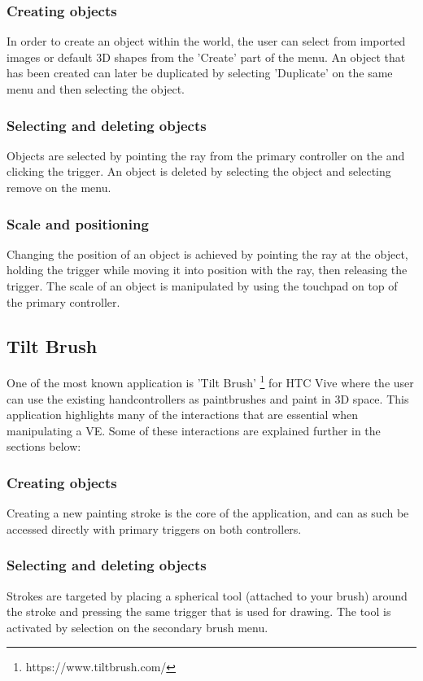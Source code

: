 \subsubsection{Creating objects}
In order to create an object within the world, the user can select from imported images or default 3D shapes from the 'Create' part of the menu. An object that has been created can later be duplicated by selecting 'Duplicate' on the same menu and then selecting the object.
\subsubsection{Selecting and deleting objects}
Objects are selected by pointing the ray from the primary controller on the and clicking the trigger. An object is deleted by selecting the object and selecting remove on the menu.
\subsubsection{Scale and positioning}
Changing the position of an object is achieved by pointing the ray at the object, holding the trigger while moving it into position with the ray, then releasing the trigger. The scale of an object is manipulated by using the touchpad on top of the primary controller.

\subsection{Tilt Brush}
\label{relatedwork:tiltbrush}
 One of the most known application is 'Tilt Brush' \footnote{https://www.tiltbrush.com/} for HTC Vive where the user can use the existing handcontrollers as paintbrushes and paint in 3D space. This application highlights many of the interactions that are essential when manipulating a VE. Some of these interactions are explained further in the sections below:
\subsubsection{Creating objects}
Creating a new painting stroke is the core of the application, and can as such be accessed directly with primary triggers on both controllers.
\subsubsection{Selecting and deleting objects}
Strokes are targeted by placing a spherical tool (attached to your brush) around the stroke and pressing the same trigger that is used for drawing. The tool is activated by selection on the secondary brush menu.
